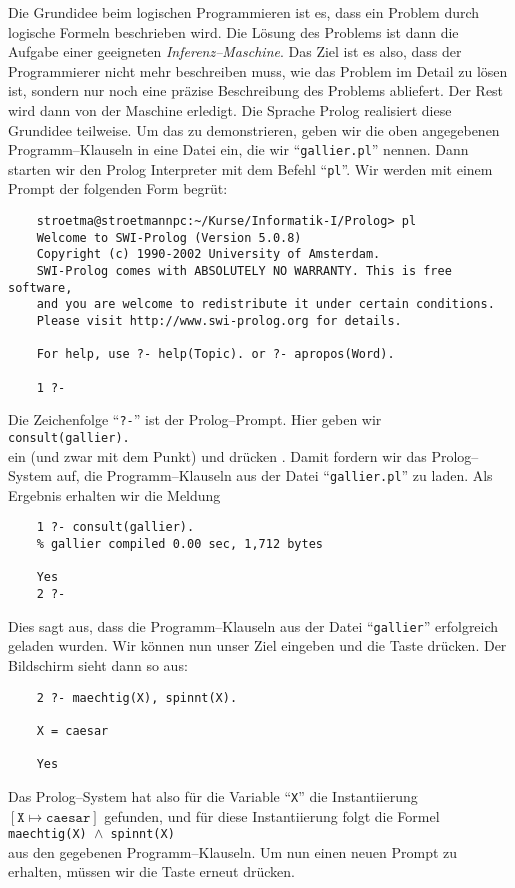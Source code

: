 Die Grundidee beim logischen Programmieren ist es, dass ein Problem durch logische Formeln
beschrieben wird.  Die L\"{o}sung des Problems ist dann die Aufgabe einer geeigneten
\emph{Inferenz--Maschine}.  Das Ziel ist es also, dass der Programmierer nicht mehr
beschreiben muss, wie das Problem im Detail zu l\"{o}sen ist, sondern nur noch eine pr\"{a}zise
Beschreibung des Problems abliefert.  Der Rest wird dann von der Maschine erledigt.
Die Sprache Prolog realisiert diese Grundidee teilweise.  Um das zu demonstrieren, geben
wir die oben angegebenen Programm--Klauseln in eine Datei ein, die wir
``\texttt{gallier.pl}'' nennen.  Dann starten wir den Prolog Interpreter mit dem Befehl
``\texttt{pl}''.  Wir werden mit einem Prompt der folgenden Form begr\"{u}\3t:
\begin{verbatim}
    stroetma@stroetmannpc:~/Kurse/Informatik-I/Prolog> pl
    Welcome to SWI-Prolog (Version 5.0.8)
    Copyright (c) 1990-2002 University of Amsterdam.
    SWI-Prolog comes with ABSOLUTELY NO WARRANTY. This is free software,
    and you are welcome to redistribute it under certain conditions.
    Please visit http://www.swi-prolog.org for details.

    For help, use ?- help(Topic). or ?- apropos(Word).

    1 ?- 
\end{verbatim}
Die Zeichenfolge ``\texttt{?-}'' ist der Prolog--Prompt.  Hier geben wir  \\[0.1cm]
\hspace*{1.3cm} \texttt{consult(gallier).} \\[0.1cm]
ein (und zwar mit dem Punkt) und dr\"{u}cken . Damit fordern wir das Prolog--System auf, die
Programm--Klauseln aus der Datei ``\texttt{gallier.pl}'' zu laden.  Als Ergebnis erhalten
wir die Meldung
\begin{verbatim}
    1 ?- consult(gallier).
    % gallier compiled 0.00 sec, 1,712 bytes

    Yes
    2 ?- 
\end{verbatim}
Dies sagt aus, dass die Programm--Klauseln aus der Datei ``\texttt{gallier}'' erfolgreich
geladen wurden. Wir k\"{o}nnen nun unser Ziel eingeben und die  Taste dr\"{u}cken.
Der Bildschirm sieht dann so aus:
\begin{verbatim}
    2 ?- maechtig(X), spinnt(X).

    X = caesar 

    Yes
\end{verbatim}
Das Prolog--System hat also  f\"{u}r die Variable
``\texttt{X}'' die Instantiierung $[ \mathtt{X} \mapsto \mathtt{caesar} ]$
gefunden, und  f\"{u}r diese Instantiierung folgt die Formel \\[0.1cm]
\hspace*{1.3cm} \texttt{maechtig(X) $\wedge$ spinnt(X)} \\[0.1cm]
aus den gegebenen Programm--Klauseln.
Um nun einen neuen Prompt zu erhalten, m\"{u}ssen  wir die  Taste erneut  dr\"{u}cken.

